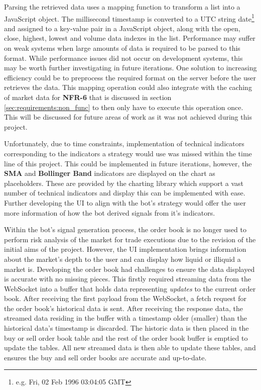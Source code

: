 Parsing the retrieved data uses a mapping function to transform a list into a JavaScript object. The millisecond timestamp is converted to a UTC string date\footnote{e.g. Fri, 02 Feb 1996 03:04:05 GMT} and assigned to a key-value pair in a JavaScript object, along with the open, close, highest, lowest and volume data indexes in the list. Performance may suffer on weak systems when large amounts of data is required to be parsed to this format. While performance issues did not occur on development systems, this may be worth further investigating in future iterations. One solution to increasing efficiency could be to preprocess the required format on the server before the user retrieves the data. This mapping operation could also integrate with the caching of market data for \textbf{NFR-6} that is discussed in section \ref{sec:requirements:non_func} to then only have to execute this operation once. This will be discussed for future areas of work as it was not achieved during this project.

Unfortunately, due to time constraints, implementation of technical indicators corresponding to the indicators a strategy would use was missed within the time line of this project. This could be implemented in future iterations, however, the \textbf{SMA} and \textbf{Bollinger Band} indicators are displayed on the chart as placeholders. These are provided by the charting library which support a vast number of technical indicators and display this can be implemented with ease. Further developing the UI to align with the bot's strategy would offer the user more information of how the bot derived signals from it's indicators.

Within the bot's signal generation process, the order book is no longer used to perform risk analysis of the market for trade executions due to the revision of the initial aims of the project. However, the UI implementation brings information about the market's depth to the user and can display how liquid or illiquid a market is. Developing the order book had challenges to ensure the data displayed is accurate with no missing pieces. This firstly required streaming data from the WebSocket into a buffer that holds data representing \textit{updates} to the current order book. After receiving the first payload from the WebSocket, a fetch request for the order book's historical data is sent. After receiving the response data, the streamed data residing in the buffer with a timestamp older (smaller) than the historical data's timestamp is discarded. The historic data is then placed in the buy or sell order book table and the rest of the order book buffer is emptied to update the tables. All new streamed data is then able to update these tables, and ensures the buy and sell order books are accurate and up-to-date.

